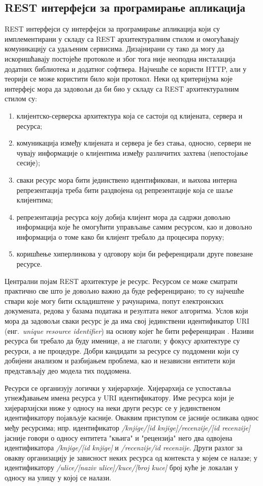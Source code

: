 \documentclass[12pt,oneside]{memoir}
\begin{document}
\subsection{REST интерфејси за програмирање апликација}
REST интерфејси су интерфејси за програмирање апликација који су имплементирани у складу са REST архитектуралним стилом и омогућавају комуникацију са удаљеним сервисима. Дизајнирани су тако да могу да искоришћавају постојеће протоколе и због тога није неоподна инсталација додатних библиотека и додатног софтвера. Најчешће се користи HTTP, али у теорији се може користити било који протокол. Неки од критеријума које интерфејс мора да задовољи да би био у складу са REST архитектуралним стилом су:
\begin{enumerate}
\item клијентско-серверска архитектура која се састоји од клијената, сервера и ресурса;
\item комуникација између клијената и сервера је без стања, односно, сервери не чувају информације о клијентима између различитих захтева (непостојање сесије);
\item сваки ресурс мора бити јединствено идентификован, и њихова интерна репрезентација треба бити раздвојена од репрезентације која се шаље клијентима;
\item репрезентација ресурса коју добија клијент мора да садржи довољно информација које ће омогућити управљање самим ресурсом, као и довољно информација о томе како би клијент требало да процесира поруку;
\item коришћење хиперлинкова у одговору који би референцирали друге повезане ресурсе.
\end{enumerate}
Централни појам REST архитектуре је ресурс. Ресурсом се може сматрати практично све што је довољно важно да буде референцирано; то су најчешће ствари које могу бити складиштене у рачунарима, попут електронских докумената, редова у базама података и резултата неког алгоритма. Услов који мора да задовољи сваки ресурс је да има свој јединствени идентификатор URI (енг.~\textit{unique resource identifier}) на основу којег ће бити референциран \cite{RESTfulWebAPIs}. Називи ресурса би требало да буду именице, а не глаголи; у фокусу архитектуре су ресурси, а не процедуре. Добри кандидати за ресурсе су поддомени који су добијени анализом и разбијањем проблема, као и независни ентитети који представљају део модела тих поддомена.

Ресурси се организују логички у хијерархије. Хијерархија се успоставља угнежђавањем имена ресурса у URI идентификатору. Име ресурса који је хијерархијски ниже у односу на неки други ресурс се у јединственом идентификатору појављује касније. Оваквим приступом се јасније осликава однос међу ресурсима; нпр. идентификатор \textit{/knjige/[id knjige]/recenzije/[id recenzije]} јасније говори о односу ентитета "књига" и "рецензија" него два одвојена идентификатора \textit{/knjige/[id knjige]} и \textit{/recenzije/id recenzije}. Други разлог за овакву организацију је зависност неких ресурса од контекста у којем се налазе; у идентификатору \textit{/ulice/[naziv ulice]/kuce/[broj kuce]} број куће је локалан у односу на улицу у којој се налази.
\end{document}
